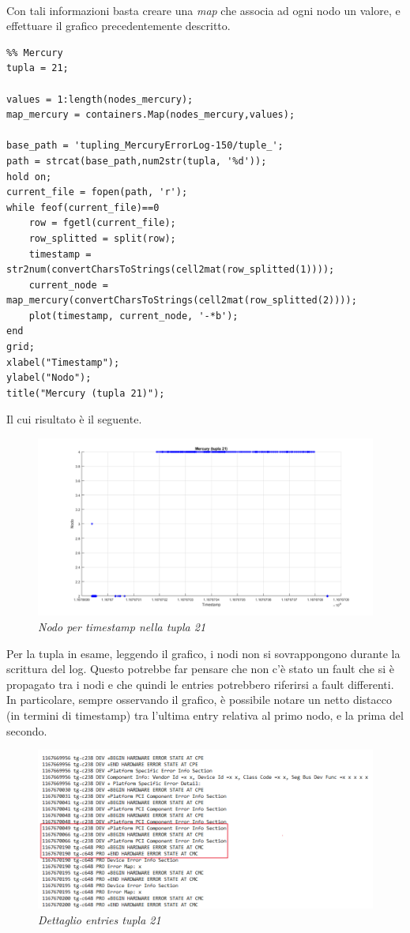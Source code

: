 \\Con tali informazioni basta creare una \textit{map} che associa ad ogni nodo un valore, e effettuare il grafico precedentemente descritto.
\begin{verbatim}
%% Mercury
tupla = 21;

values = 1:length(nodes_mercury);
map_mercury = containers.Map(nodes_mercury,values);

base_path = 'tupling_MercuryErrorLog-150/tuple_';
path = strcat(base_path,num2str(tupla, '%d'));
hold on;
current_file = fopen(path, 'r');
while feof(current_file)==0
	row = fgetl(current_file);
	row_splitted = split(row);
	timestamp = str2num(convertCharsToStrings(cell2mat(row_splitted(1))));
	current_node = map_mercury(convertCharsToStrings(cell2mat(row_splitted(2))));
	plot(timestamp, current_node, '-*b');
end
grid;
xlabel("Timestamp");
ylabel("Nodo");
title("Mercury (tupla 21)");
\end{verbatim}
Il cui risultato è il seguente.
\begin{figure}[H]
	\centering
	\includegraphics[width=\textwidth]{img/hw6/collisione_mercury.png}
	\caption{\textit{Nodo per timestamp nella tupla 21}}
\end{figure}
Per la tupla in esame, leggendo il grafico, i nodi non si sovrappongono durante la scrittura del log. Questo potrebbe far pensare che non c'è stato un fault che si è propagato tra i nodi e che quindi le entries potrebbero riferirsi a fault differenti.
\\In particolare, sempre osservando il grafico, è possibile notare un netto distacco (in termini di timestamp) tra l'ultima entry relativa al primo nodo, e la prima del secondo.
\begin{figure}[H]
	\centering
	\includegraphics[width=\textwidth]{img/hw6/tupla21.png}
	\caption{\textit{Dettaglio entries tupla 21}}
\end{figure}

